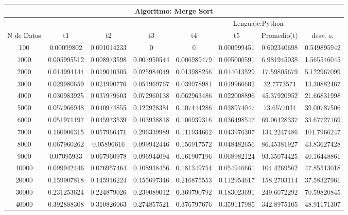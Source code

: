 \documentclass{article}
\begin{document}
                    \begin{table}[]
        \begin{tabular}{|c|c|c|c|c|c|c|c| }
            \hline
            \multicolumn{8}{|c|}{Algoritmo: Merge Sort} \\ \hline
            \multicolumn{4}{|c|}{} & \multicolumn{4}{c|}{Lenguaje:Python} \\ \hline
              N de Datos &     t1    &  t2         &  t3          &   t4        &    t5     &   Promedio(t)       & desv. s. \\ \hline
100 &	0.00099802	 &0.001014233	 &0 &	0 &	0.000999451 &	0.602340698	 &0.549895942\\ \hline
1000 &	0.005995512 &	0.008973598 &	0.007950544 &	0.006989479 &	0.005000591 &	6.981945038	 &1.565546045\\ \hline
2000 &	0.014994144	 &0.019010305 &	0.025984049 &	0.013988256 &	0.014013529	 &17.59805679	 &5.122967099\\ \hline
3000 &	0.029980659 &	0.021990776 &	0.051969767 &	0.039978981 &	0.019966602 &	32.7773571	 &13.30882467\\ \hline
4000	 &0.030983925 &	0.037979603 &	0.072960138 &	0.062963486 &	0.022008896 &	45.37920952	 &21.66831998\\ \hline
5000 &	0.057966948	 &0.040974855 &	0.122928381 &	0.107444286 &	0.038974047 &	73.6577034	 &39.00787506\\ \hline
6000 &	0.051971197 &	0.045973539 &	0.103938818 &	0.106939316 &	0.036498547 &	69.06428337	 &33.67727169\\ \hline
7000 &	0.160906315 &	0.057966471 &	0.296339989 &	0.111934662 &	0.043976307 &	134.2247486	 &101.7966247\\ \hline
8000 &	0.067960262 &	0.05896616 &	0.099942446 &	0.156917572 &	0.048482656 &	86.45381927 &	43.83627428\\ \hline
9000 &	0.07095933	 &0.067960978 &	0.096944094 &	0.161907196 &	0.068982124 &	93.35074425 &	40.16448861\\ \hline
10000 &	0.099942446 &	0.076957464 &	0.108938456 &	0.181349754 &	0.054946661	 &104.4269562	 &47.85513018\\ \hline
20000 &	0.159907818 &	0.145916224 &	0.155697346 &	0.216875553 &	0.112954617	 &158.2703114	 &37.58327961\\ \hline
30000 &	0.231253624 &	0.224879026 &	0.239089012 &	0.369790792 &	0.183023691	 &249.6072292 &	70.59820845\\ \hline
40000 &	0.392888308 &	0.310826063 &	0.274857521 &	0.376797676 &	0.359117985	 &342.8975105	 &48.91171307\\ \hline

\end{tabular}
\end{table}
\end{document}
